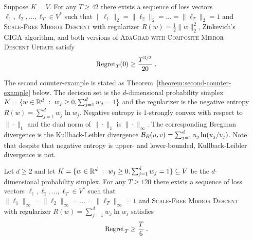 \begin{theorem}
\label{theorem:first-counter-example}
Suppose $K = V$. For any $T \ge 42$ there exists a sequence of loss vectors
$\ell_1, \ell_2, \dots, \ell_T \in V^*$ such that $\|\ell_1\|_2 = \|\ell_2\|_2
= \dots = \|\ell_T\|_2 = 1$ and \textsc{Scale-Free Mirror Descent} with
regularizer $R(w) = \frac{1}{2}\|w\|_2^2$, Zinkevich's \textsc{GIGA} algorithm,
and both versions of \textsc{AdaGrad with Composite Mirror Descent Update}
satisfy
$$
\operatorname{Regret}_T(0) \ge \frac{T^{3/2}}{20} \; .
$$
\end{theorem}

The second counter-example is stated as Theorem~\ref{theorem:second-counter-example}
below.  The decision set is the $d$-dimensional probability simplex $K = \{ w
\in \mathbb{R}^d ~:~ w_j \ge 0, \sum_{j=1}^d w_j = 1 \}$ and the regularizer is the
negative entropy $R(w) = \sum_{j=1}^d w_j \ln w_j$.  Negative entropy is
$1$-strongly convex with respect to $\|\cdot\|_1$ and the dual norm of
$\|\cdot\|_1$ is \mbox{$\|\cdot\|_\infty$}.  The corresponding Bregman
divergence is the Kullback-Leibler divergence $\mathcal{B}_R(u,v) = \sum_{j=1}^d u_j
\ln(u_j/v_j)$.  Note that despite that negative entropy is upper- and
lower-bounded, Kullback-Leibler divergence is not.

\begin{theorem}
\label{theorem:second-counter-example}
Let $d \ge 2$ and let $K = \{ w \in \mathbb{R}^d ~:~ w_j \ge 0, \sum_{j=1}^d w_j = 1 \}
\subseteq V$ be the $d$-dimensional probability simplex.  For any $T \ge 120$
there exists a sequence of loss vectors $\ell_1, \ell_2, \dots, \ell_T \in V^*$
such that $\|\ell_1\|_\infty = \|\ell_2\|_\infty = \dots = \|\ell_T\|_\infty =
1$ and \textsc{Scale-Free Mirror Descent} with regularizer $R(w) = \sum_{j=1}^d
w_j \ln w_j$ satisfies
$$
\operatorname{Regret}_T \ge \frac{T}{6} \; .
$$
\end{theorem}
